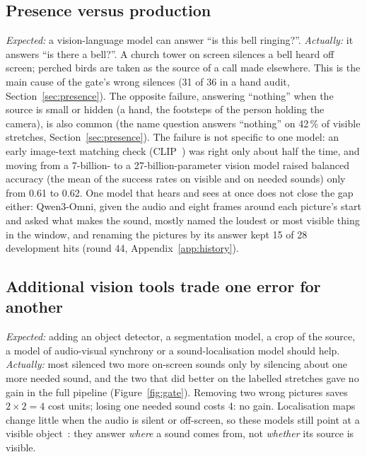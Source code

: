 \subsection{Presence versus production}\label{sec:hard-presence}
\emph{Expected:} a vision-language model can answer ``is this bell ringing?''. \emph{Actually:} it answers ``is there a
bell?''. A church tower on screen silences a bell heard off screen; perched birds are taken as the source of a call
made elsewhere. This is the main cause of the gate's wrong silences (31 of 36 in a hand audit,
Section~\ref{sec:presence}). The opposite failure, answering ``nothing'' when the source is small or hidden (a hand,
the footsteps of the person holding the camera), is also common (the name question answers ``nothing'' on 42\,\% of visible stretches, Section~\ref{sec:presence}). The failure is not specific to one model: an early image-text matching check (CLIP~\cite{radford2021clip}) was right
only about half the time, and moving from a 7-billion- to a 27-billion-parameter vision model raised balanced accuracy
(the mean of the success rates on visible and on needed sounds) only from 0.61 to 0.62. One model that hears and
sees at once does not close the gap either: Qwen3-Omni, given the audio and eight frames around each picture's start
and asked what makes the sound, mostly named the loudest or most visible thing in the window, and renaming the
pictures by its answer kept 15 of 28 development hits (round 44, Appendix~\ref{app:history}).

\subsection{Additional vision tools trade one error for another}
\emph{Expected:} adding an object detector, a segmentation model, a crop of the source, a model of audio-visual
synchrony or a sound-localisation model should help. \emph{Actually:} most silenced two more on-screen sounds only by
silencing about one more needed sound, and the two that did better on the labelled stretches gave no gain in the full pipeline (Figure~\ref{fig:gate}). Removing two wrong pictures saves $2\times2 = 4$ cost units;
losing one needed sound costs 4: no gain. Localisation maps change little when the audio is silent or off-screen, so these models still point at a visible
object~\cite{juanola2025critical}: they answer \emph{where} a sound comes from, not \emph{whether} its source is visible.


